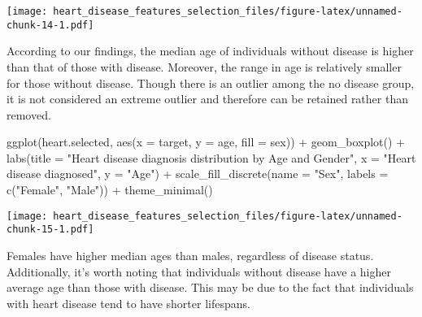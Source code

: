 \documentclass[
]{article}
\newenvironment{Shaded}{\begin{snugshade}}{\end{snugshade}}
\newcommand{\AttributeTok}[1]{\textcolor[rgb]{0.77,0.63,0.00}{#1}}
\newcommand{\FunctionTok}[1]{\textcolor[rgb]{0.00,0.00,0.00}{#1}}
\newcommand{\NormalTok}[1]{#1}
\newcommand{\SpecialCharTok}[1]{\textcolor[rgb]{0.00,0.00,0.00}{#1}}
\newcommand{\StringTok}[1]{\textcolor[rgb]{0.31,0.60,0.02}{#1}}
\begin{document}
\begin{Shaded}
\end{Shaded}

\texttt{[image: heart\_disease\_features\_selection\_files/figure-latex/unnamed-chunk-14-1.pdf]}

According to our findings, the median age of individuals without disease
is higher than that of those with disease. Moreover, the range in age is
relatively smaller for those without disease. Though there is an outlier
among the no disease group, it is not considered an extreme outlier and
therefore can be retained rather than removed.

\begin{Shaded}
\begin{Highlighting}[]
\FunctionTok{ggplot}\NormalTok{(heart.selected, }\FunctionTok{aes}\NormalTok{(}\AttributeTok{x =}\NormalTok{ target, }\AttributeTok{y =}\NormalTok{ age, }\AttributeTok{fill =}\NormalTok{ sex)) }\SpecialCharTok{+}
  \FunctionTok{geom\_boxplot}\NormalTok{() }\SpecialCharTok{+}
  \FunctionTok{labs}\NormalTok{(}\AttributeTok{title =} \StringTok{"Heart disease diagnosis distribution by Age and Gender"}\NormalTok{,}
       \AttributeTok{x =} \StringTok{"Heart disease diagnosed"}\NormalTok{,}
       \AttributeTok{y =} \StringTok{"Age"}\NormalTok{) }\SpecialCharTok{+}
  \FunctionTok{scale\_fill\_discrete}\NormalTok{(}\AttributeTok{name =} \StringTok{"Sex"}\NormalTok{,}
                      \AttributeTok{labels =} \FunctionTok{c}\NormalTok{(}\StringTok{"Female"}\NormalTok{, }\StringTok{"Male"}\NormalTok{)) }\SpecialCharTok{+}
  \FunctionTok{theme\_minimal}\NormalTok{()}
\end{Highlighting}
\end{Shaded}

\texttt{[image: heart\_disease\_features\_selection\_files/figure-latex/unnamed-chunk-15-1.pdf]}

Females have higher median ages than males, regardless of disease
status. Additionally, it's worth noting that individuals without disease
have a higher average age than those with disease. This may be due to
the fact that individuals with heart disease tend to have shorter
lifespans.
\end{document}
